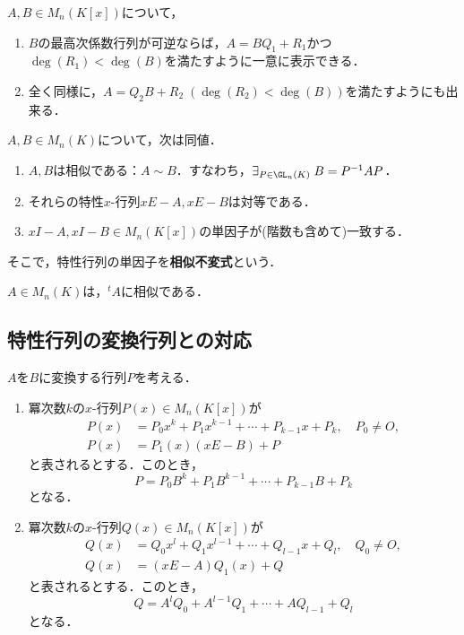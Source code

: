 \documentclass[uplatex, dvipdfmx]{jsreport}
\begin{document}
\begin{lemma}[${M_n(K[x])}$はEuclid整域である]
    $A,B\in M_n(K[x])$について，
    \begin{enumerate}
        \item $B$の最高次係数行列が可逆ならば，$A=BQ_1+R_1$かつ$\deg(R_1)<\deg(B)$を満たすように一意に表示できる．
        \item 全く同様に，$A=Q_2B+R_2\;(\deg(R_2)<\deg(B))$を満たすようにも出来る．
    \end{enumerate}
\end{lemma}

\begin{theorem}
    $A,B\in M_n(K)$について，次は同値．
    \begin{enumerate}
        \item $A,B$は相似である：$A\sim B$．すなわち，$\exists_{P\in\GL_n(K)}\;B=P^{-1}AP$．
        \item それらの特性$x$-行列$xE-A,xE-B$は対等である．
        \item $xI-A,xI-B\in M_n(K[x])$の単因子が(階数も含めて)一致する．
    \end{enumerate}
    そこで，特性行列の単因子を\textbf{相似不変式}という．
\end{theorem}

\begin{corollary}[証明抽出]
    $A\in M_n(K)$は，${}^t\!A$に相似である．
\end{corollary}

\subsection{特性行列の変換行列との対応}

\begin{tcolorbox}[colframe=ForestGreen, colback=ForestGreen!10!white,breakable,colbacktitle=ForestGreen!40!white,coltitle=black,fonttitle=\bfseries\sffamily,
title=]
    $A$を$B$に変換する行列$P$を考える．
\end{tcolorbox}

\begin{proposition}[${M_n(K)[x]}$上の剰余定理]\mbox{}
    \begin{enumerate}
        \item 冪次数$k$の$x$-行列$P(x)\in M_n(K[x])$が
        \begin{align*}
            P(x)&=P_0x^k+P_1x^{k-1}+\cdots+P_{k-1}x+P_k,\quad P_0\ne O,\\
            P(x)&=P_1(x)(xE-B)+P
        \end{align*}
        と表されるとする．このとき，
        \[P=P_0B^k+P_1B^{k-1}+\cdots+P_{k-1}B+P_k\]
        となる．
        \item 冪次数$k$の$x$-行列$Q(x)\in M_n(K[x])$が
        \begin{align*}
            Q(x)&=Q_0x^l+Q_1x^{l-1}+\cdots+Q_{l-1}x+Q_l,\quad Q_0\ne O,\\
            Q(x)&=(xE-A)Q_1(x)+Q
        \end{align*}
        と表されるとする．このとき，
        \[Q=A^lQ_0+A^{l-1}Q_1+\cdots+AQ_{l-1}+Q_l\]
        となる．
    \end{enumerate}
\end{proposition}
\end{document}
